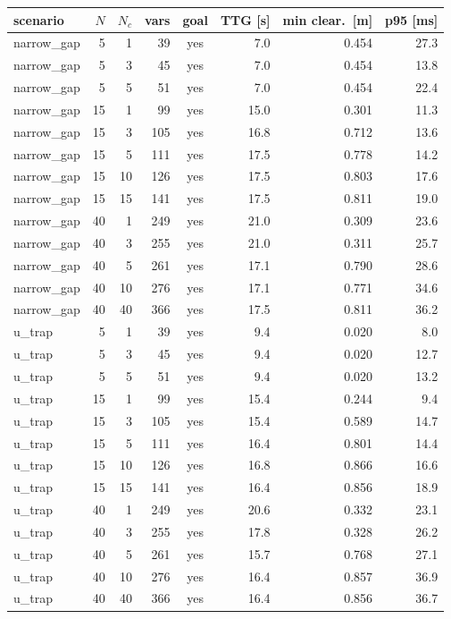 \begin{tabular}{lrrrcrrr}
  \toprule
  scenario & $N$ & $N_c$ & vars & goal & TTG [s] & min clear.\ [m] & p95 [ms] \\
  \midrule
  narrow\_gap & 5 & 1 & 39 & yes & 7.0 & 0.454 & 27.3 \\
  narrow\_gap & 5 & 3 & 45 & yes & 7.0 & 0.454 & 13.8 \\
  narrow\_gap & 5 & 5 & 51 & yes & 7.0 & 0.454 & 22.4 \\
  narrow\_gap & 15 & 1 & 99 & yes & 15.0 & 0.301 & 11.3 \\
  narrow\_gap & 15 & 3 & 105 & yes & 16.8 & 0.712 & 13.6 \\
  narrow\_gap & 15 & 5 & 111 & yes & 17.5 & 0.778 & 14.2 \\
  narrow\_gap & 15 & 10 & 126 & yes & 17.5 & 0.803 & 17.6 \\
  narrow\_gap & 15 & 15 & 141 & yes & 17.5 & 0.811 & 19.0 \\
  narrow\_gap & 40 & 1 & 249 & yes & 21.0 & 0.309 & 23.6 \\
  narrow\_gap & 40 & 3 & 255 & yes & 21.0 & 0.311 & 25.7 \\
  narrow\_gap & 40 & 5 & 261 & yes & 17.1 & 0.790 & 28.6 \\
  narrow\_gap & 40 & 10 & 276 & yes & 17.1 & 0.771 & 34.6 \\
  narrow\_gap & 40 & 40 & 366 & yes & 17.5 & 0.811 & 36.2 \\
  u\_trap & 5 & 1 & 39 & yes & 9.4 & 0.020 & 8.0 \\
  u\_trap & 5 & 3 & 45 & yes & 9.4 & 0.020 & 12.7 \\
  u\_trap & 5 & 5 & 51 & yes & 9.4 & 0.020 & 13.2 \\
  u\_trap & 15 & 1 & 99 & yes & 15.4 & 0.244 & 9.4 \\
  u\_trap & 15 & 3 & 105 & yes & 15.4 & 0.589 & 14.7 \\
  u\_trap & 15 & 5 & 111 & yes & 16.4 & 0.801 & 14.4 \\
  u\_trap & 15 & 10 & 126 & yes & 16.8 & 0.866 & 16.6 \\
  u\_trap & 15 & 15 & 141 & yes & 16.4 & 0.856 & 18.9 \\
  u\_trap & 40 & 1 & 249 & yes & 20.6 & 0.332 & 23.1 \\
  u\_trap & 40 & 3 & 255 & yes & 17.8 & 0.328 & 26.2 \\
  u\_trap & 40 & 5 & 261 & yes & 15.7 & 0.768 & 27.1 \\
  u\_trap & 40 & 10 & 276 & yes & 16.4 & 0.857 & 36.9 \\
  u\_trap & 40 & 40 & 366 & yes & 16.4 & 0.856 & 36.7 \\
  \bottomrule
\end{tabular}
